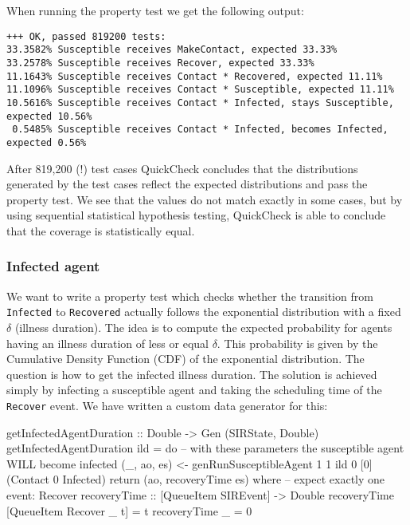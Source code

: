 When running the property test we get the following output:

\begin{footnotesize}
\begin{verbatim}
+++ OK, passed 819200 tests:
33.3582% Susceptible receives MakeContact, expected 33.33%
33.2578% Susceptible receives Recover, expected 33.33%
11.1643% Susceptible receives Contact * Recovered, expected 11.11%
11.1096% Susceptible receives Contact * Susceptible, expected 11.11%
10.5616% Susceptible receives Contact * Infected, stays Susceptible, expected 10.56%
 0.5485% Susceptible receives Contact * Infected, becomes Infected, expected 0.56%
\end{verbatim}
\end{footnotesize}

After 819,200 (!) test cases QuickCheck concludes that the distributions generated by the test cases reflect the expected distributions and pass the property test. We see that the values do not match exactly in some cases, but by using sequential statistical hypothesis testing, QuickCheck is able to conclude that the coverage is statistically equal.

\subsubsection{Infected agent}
We want to write a property test which checks whether the transition from \texttt{Infected} to \texttt{Recovered} actually follows the exponential distribution with a fixed $\delta$ (illness duration). The idea is to compute the expected probability for agents having an illness duration of less or equal $\delta$. This probability is given by the Cumulative Density Function (CDF) of the exponential distribution. The question is how to get the infected illness duration. The solution is achieved simply by infecting a susceptible agent and taking the scheduling time of the \texttt{Recover} event. We have written a custom data generator for this:

\begin{HaskellCode}
getInfectedAgentDuration :: Double -> Gen (SIRState, Double)
getInfectedAgentDuration ild = do
  -- with these parameters the susceptible agent WILL become infected
  (_, ao, es) <- genRunSusceptibleAgent 1 1 ild 0 [0] (Contact 0 Infected)
  return (ao, recoveryTime es)
  where
    -- expect exactly one event: Recover
    recoveryTime :: [QueueItem SIREvent] -> Double
    recoveryTime [QueueItem Recover _ t]  = t
    recoveryTime _ = 0
\end{HaskellCode}

